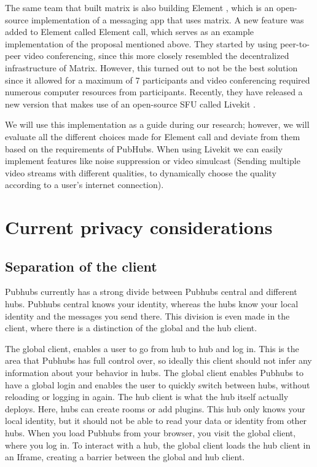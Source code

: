 \documentclass{report}
\theoremstyle{definition}
\theoremstyle{remark}
\begin{document}
The same team that built matrix is also building Element \cite{ELEMENT}, which is an open-source implementation of a messaging app that uses matrix. A new feature was added to Element called Element call, which serves as an example implementation of the proposal mentioned above. They started by using peer-to-peer video conferencing, since this more closely resembled the decentralized infrastructure of Matrix. However, this turned out to not be the best solution since it allowed for a maximum of 7 participants and video conferencing required numerous computer resources from participants. Recently, they have released a new version that makes use of an open-source SFU called Livekit \cite{LIVEKIT}.

We will use this implementation as a guide during our research; however, we will evaluate all the different choices made for Element call and deviate from them based on the requirements of PubHubs. When using Livekit we can easily implement features like noise suppression or video simulcast (Sending multiple video streams with different qualities, to dynamically choose the quality according to a user's internet connection).

\section{Current privacy considerations}
\subsection{Separation of the client}
Pubhubs currently has  a strong divide between Pubhubs central and different hubs. Pubhubs central knows your identity, whereas the hubs know your local identity and the messages you send there. This division is even made in the client, where there is a distinction of the global and the hub client. 

The global client, enables a user to go from hub to hub and log in. This is the area that Pubhubs has full control over, so ideally this client should not infer any information about your behavior in hubs. The global client enables Pubhubs to have a global login and enables the user to quickly switch between hubs, without reloading or logging in again. The hub client is what the hub itself actually deploys. Here, hubs can create rooms or add plugins. This hub only knows your local identity, but it should not be able to read your data or identity from other hubs. When you load Pubhubs from your browser, you visit the global client, where you log in. To interact with a hub, the global client loads the hub client in an Iframe, creating a barrier between the global and hub client. 
\end{document}
